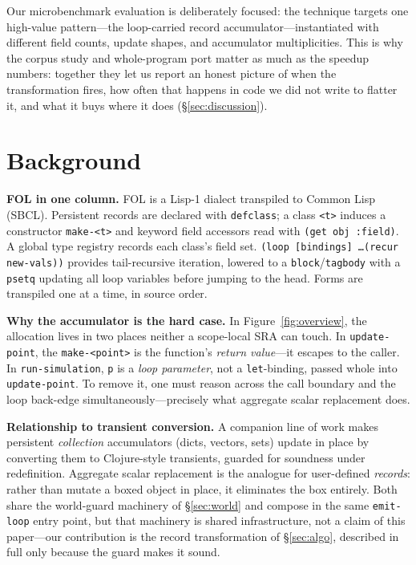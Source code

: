 \documentclass[sigplan,screen,review,anonymous]{acmart}
\begin{document}
Our microbenchmark evaluation is deliberately focused: the technique targets
one high-value pattern---the loop-carried record accumulator---instantiated
with different field counts, update shapes, and accumulator multiplicities.
This is why the corpus study and whole-program port matter as
much as the speedup numbers: together they let us report an honest
picture of when the transformation fires, how often that happens in code we
did not write to flatter it, and what it buys where it does
(\S\ref{sec:discussion}).

\section{Background}

\textbf{FOL in one column.} FOL is a Lisp-1 dialect transpiled to Common Lisp
(SBCL). Persistent records are declared with \texttt{defclass}; a class
\texttt{<t>} induces a constructor \texttt{make-<t>} and keyword field
accessors read with \texttt{(get obj :field)}. A global type registry records
each class's field set. \texttt{(loop [bindings] \ldots (recur
new-vals))} provides tail-recursive iteration, lowered to a
\texttt{block}/\texttt{tagbody} with a \texttt{psetq} updating all loop
variables before jumping to the head. Forms are transpiled one
at a time, in source order.

\textbf{Why the accumulator is the hard case.} In
Figure~\ref{fig:overview}, the allocation lives in two places neither
a scope-local SRA can touch. In \texttt{update-point}, the \texttt{make-<point>}
is the function's \emph{return value}---it escapes to the caller. In
\texttt{run-simulation}, \texttt{p} is a \emph{loop parameter}, not a
\texttt{let}-binding, passed whole into \texttt{update-point}. To
remove it, one must reason across the call boundary and the
loop back-edge simultaneously---precisely what aggregate scalar
replacement does.

\textbf{Relationship to transient conversion.} A companion line of work makes
persistent \emph{collection} accumulators (dicts, vectors, sets) update in place
by converting them to Clojure-style transients, guarded for soundness under
redefinition. Aggregate scalar replacement is the analogue for user-defined
\emph{records}: rather than mutate a boxed object in place, it eliminates the box
entirely. Both share the world-guard machinery of \S\ref{sec:world} and
compose in the same \texttt{emit-loop} entry point, but that machinery is
shared infrastructure, not a claim of this
paper---our contribution is the record transformation of \S\ref{sec:algo},
described in full only because the guard makes it sound.
\end{document}

